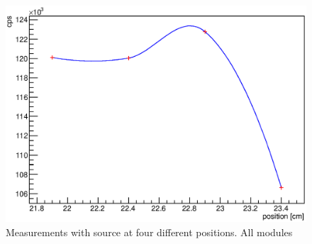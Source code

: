 \begin{figure}
\begin{minipage}[d]{0.24 \textwidth}
	\end{minipage}
	\begin{minipage}[d]{0.24 \textwidth}
		  \includegraphics[width=\textwidth]{graphics/cobalt/modules/8B.eps}
	\end{minipage}
	
	
  	\caption[Testing of muon modules with Sr source]{Measurements with source at four different positions. All modules }
  	\label{fig:SrRatesPMT}
  \end{figure}

